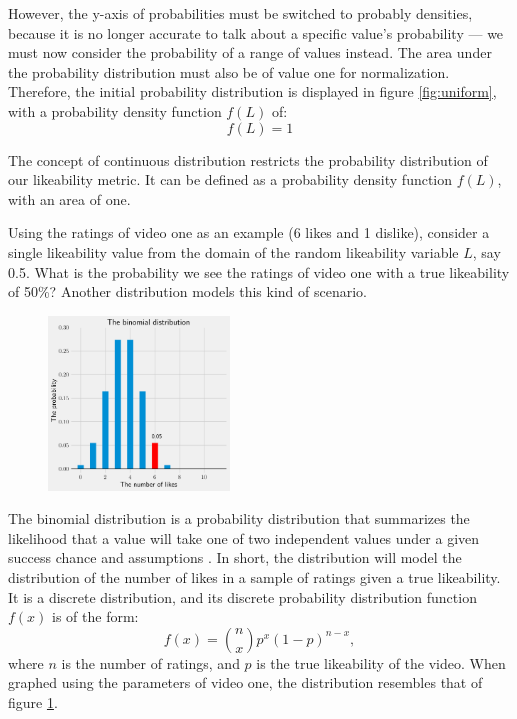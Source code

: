 \documentclass[a4paper,11pt]{article}
\begin{document}
However, the y-axis of probabilities must be switched to probably densities, because it is no longer accurate to talk about a specific value's probability --- we must now consider the probability of a range of values instead. The area under the probability distribution must also be of value one for normalization. Therefore, the initial probability distribution is displayed in figure \ref{fig:uniform}, with a probability density function $f(L)$ of:
\[
    f(L) = 1
\]

The concept of continuous distribution restricts the probability distribution of our likeability metric. It can be defined as a probability density function $f(L)$, with an area of one.

Using the ratings of video one as an example (6 likes and 1 dislike), consider a single likeability value from the domain of the random likeability variable $L$, say 0.5. What is the probability we see the ratings of video one with a true likeability of 50\%? Another distribution models this kind of scenario.

\begin{figure}
    \includegraphics[width=0.43\textwidth,right]{assets/bino_pdfs.png}
    \caption{}
    \label{fig:bino}
\end{figure}

The binomial distribution is a probability distribution that summarizes the likelihood that a value will take one of two independent values under a given success chance and assumptions \parencite{barone_2021}. In short, the distribution will model the distribution of the number of likes in a sample of ratings given a true likeability. It is a discrete distribution, and its discrete probability distribution function $f(x)$ is of the form:
\[
    f(x) = {n \choose x} p^x (1-p)^{n-x},
\]
where $n$ is the number of ratings, and $p$ is the true likeability of the video. When graphed using the parameters of video one, the distribution resembles that of figure \ref{fig:bino}.
\end{document}

